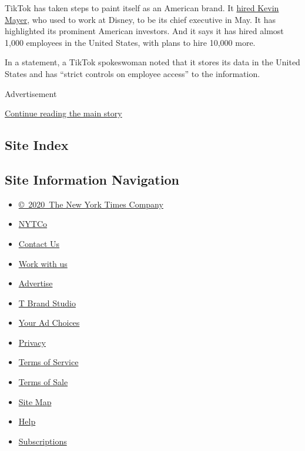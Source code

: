 TikTok has taken steps to paint itself as an American brand. It
\href{https://www.nytimes.com/2020/05/18/business/media/tiktok-ceo-kevin-mayer.html}{hired
Kevin Mayer}, who used to work at Disney, to be its chief executive in
May. It has highlighted its prominent American investors. And it says it
has hired almost 1,000 employees in the United States, with plans to
hire 10,000 more.

In a statement, a TikTok spokeswoman noted that it stores its data in
the United States and has ``strict controls on employee access'' to the
information.

Advertisement

\protect\hyperlink{after-bottom}{Continue reading the main story}

\hypertarget{site-index}{%
\subsection{Site Index}\label{site-index}}

\hypertarget{site-information-navigation}{%
\subsection{Site Information
Navigation}\label{site-information-navigation}}

\begin{itemize}
\tightlist
\item
  \href{https://help.nytimes.com/hc/en-us/articles/115014792127-Copyright-notice}{©~2020~The
  New York Times Company}
\end{itemize}

\begin{itemize}
\tightlist
\item
  \href{https://www.nytco.com/}{NYTCo}
\item
  \href{https://help.nytimes.com/hc/en-us/articles/115015385887-Contact-Us}{Contact
  Us}
\item
  \href{https://www.nytco.com/careers/}{Work with us}
\item
  \href{https://nytmediakit.com/}{Advertise}
\item
  \href{http://www.tbrandstudio.com/}{T Brand Studio}
\item
  \href{https://www.nytimes.com/privacy/cookie-policy\#how-do-i-manage-trackers}{Your
  Ad Choices}
\item
  \href{https://www.nytimes.com/privacy}{Privacy}
\item
  \href{https://help.nytimes.com/hc/en-us/articles/115014893428-Terms-of-service}{Terms
  of Service}
\item
  \href{https://help.nytimes.com/hc/en-us/articles/115014893968-Terms-of-sale}{Terms
  of Sale}
\item
  \href{https://spiderbites.nytimes.com}{Site Map}
\item
  \href{https://help.nytimes.com/hc/en-us}{Help}
\item
  \href{https://www.nytimes.com/subscription?campaignId=37WXW}{Subscriptions}
\end{itemize}
